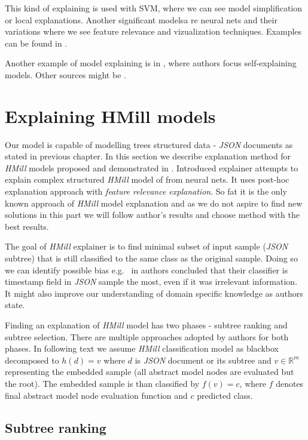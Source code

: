 This kind of explaining is used with SVM, where we can see model simplification or local explanations. Another significant modelsa re neural nets and their variations where we see feature relevance and vizualization techniques. Examples can be found in \cite{Arrieta2019}.

Another example of model explaining is in \cite{Alvarez-Melis2018}, where authors focus self-explaining models. Other sources might be \cite{Strumbelj2013,Robnik-Sikonja2008,Montavon2018}.


\section{Explaining HMill models}
Our model is capable of modelling trees structured data - \emph{JSON} documents as stated in previous chapter. In this section we describe explanation method for \emph{HMill} models proposed and demonstrated in \cite{Pevny2020}. Introduced explainer attempts to explain complex structured \emph{HMill} model of from neural nets. It uses post-hoc explanation approach with \emph{feature relevance explanation}. So fat it is the only known approach of \emph{HMill} model explanation and as we do not aspire to find new solutions in this part we will follow author's results and choose method with the best results.

The goal of \emph{HMill} explainer is to find minimal subset of input sample (\emph{JSON} subtree) that is still classified to the same class as the original sample. Doing so we can identify possible bias e.g. \ in \cite{Mandlik2020} authors concluded that their classifier is timestamp field in \emph{JSON} sample the most, even if it was irrelevant information. It might also improve our understanding of domain specific knowledge as authors state.

Finding an explanation of \emph{HMill} model has two phases - subtree ranking and subtree selection. There are multiple approaches adopted by authors for both phases. In following text we assume \emph{HMill} classification model as blackbox decomposed to $h(d)=v$ where $d$ is \emph{JSON} document or its subtree and $v\in\mathbb{R}^{m}$ representing the embedded sample (all abstract model nodes are evaluated but the root). The embedded sample is than classified by $f(v)=c$, where $f$ denotes final abstract model node evaluation function and $c$ predicted class.

\subsection{Subtree ranking}
